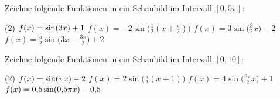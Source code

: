 \documentclass{scrartcl}
\begin{document}
\begin{question}
  Zeichne folgende Funktionen in ein Schaubild im Intervall $[0,5\pi]$:
  \begin{tasks}(2)
    \task $f(x)=\sin(3x)+1 \vphantom{\big(}$
    \task $f(x)=-2\sin\bigl(\frac{1}{2}\left(x+\frac{\pi}{2}\right)\bigr)$
    \task $f(x)=3\sin\bigl(\frac{3}{2}x\bigr)-2$
    \task $f(x)=\frac{5}{2}\sin\bigl(3x-\frac{3\pi}{2}\bigr)+2$
  \end{tasks}
\end{question}

\begin{question}
  Zeichne folgende Funktionen in ein Schaubild im Intervall $[0,10]$:
  \begin{tasks}(2)
    \task $f(x)=\sin(\pi x)-2 \vphantom{\big(}$
    \task $f(x)=2\sin\bigl(\frac{\pi}{2}(x+1)\bigr)$
    \task $f(x)=4\sin\bigl(\frac{3\pi}{2}x\bigr)+1$
    \task $f(x)=0{,}5\sin(0{,}5\pi x)-0{,}5 \vphantom{\big(}$
  \end{tasks}
\end{question}

\printsolutions
\end{document}
